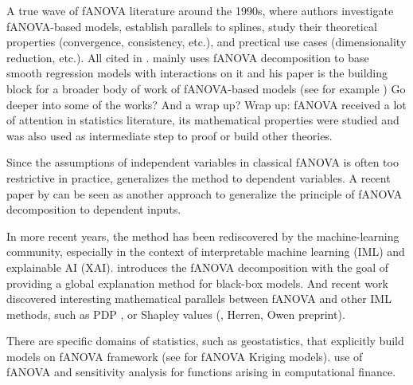 A true wave of fANOVA literature around the 1990s, where authors investigate fANOVA-based models, establish parallels to splines, study their theoretical properties (convergence, consistency, etc.), and prectical use cases (dimensionality reduction, etc.). All cited in \cite{huang1998a}.
\cite{stone1994} mainly uses fANOVA  decomposition to base smooth regression models with interactions on it and his paper is the building block for a broader body of work of fANOVA-based models (see for example \cite{Huang1996, huang1998a})
Go deeper into some of the works? And a wrap up? Wrap up: fANOVA received a lot of attention in statistics literature, its mathematical properties were studied and was also used as intermediate step to proof or build other theories.


Since the assumptions of independent variables in classical fANOVA is often too restrictive in practice, \cite{hooker2007} generalizes the method to dependent variables. A recent paper by \cite{ilidrissi2025} can be seen as another approach to generalize the principle of fANOVA decomposition to dependent inputs.\par

In more recent years, the method has been rediscovered by the machine-learning community, especially in the context of interpretable machine learning (IML) and explainable AI (XAI). \cite{hooker2004} introduces the fANOVA decomposition with the goal of providing a global explanation method for black-box models.
And recent work discovered interesting mathematical parallels between fANOVA and other IML methods, such as PDP \cite{friedman2001}, or Shapley values (\cite{fumagalli2025}, Herren, Owen preprint).


There are specific domains of statistics, such as geostatistics, that explicitly build models on fANOVA framework (see \cite{muehlenstaedt2012} for fANOVA Kriging models).
\cite{liu2006} use of fANOVA and sensitivity analysis for functions arising in computational finance.

